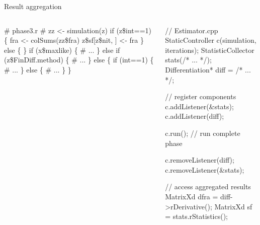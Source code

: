 \documentclass[]{beamer}                                                %
\def\scriptsize{\fontsize{7pt}{8pt}\selectfont}
\begin{document}
\begin{frame}[fragile,t]{Result aggregation}                            %
  \def\fInit{1}
  \def\fReg{2}
  \def\fRun{3}
  \def\fUnreg{4}
  \def\fAccess{5}
  \vfill
  \begin{columns}
    \begin{semiverbatim}\scriptsize
# phase3.r
# zz <- simulation(z)
if (z\$int==1) \{
  fra <- colSums(zz\$fra)
  z\$sf[z\$nit, ] <- fra
\} else \{
\}
if (x\$maxlike) \{ # ...
\} else if (z\$FinDiff.method) \{ # ...
\} else \{
  if (int==1) \{ # ...
  \} else \{ # ...
  \}
\}
    \end{semiverbatim}%

    \begin{semiverbatim}\scriptsize
// Estimator.cpp
StaticController c(simulation, iterations);
StatisticCollector stats(/* ... */);
Differentiation* diff = \alert<\fInit>{/* ... */};

// register components
\alert<\fReg>{c.addListener(&stats);}
\alert<\fReg>{c.addListener(diff);}

\alert<\fRun>{c.run();} // run complete phase

\alert<\fUnreg>{c.removeListener(diff);}
\alert<\fUnreg>{c.removeListener(&stats);}

// access aggregated results
MatrixXd dfra = \alert<\fAccess>{diff->rDerivative()};
MatrixXd sf = \alert<\fAccess>{stats.rStatistics()};
    \end{semiverbatim}
  \end{columns}
  \vfill



\end{frame}
\end{document}
